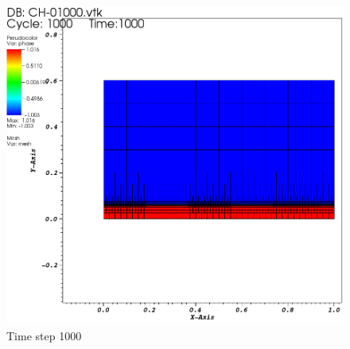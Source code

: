 \documentclass[9pt]{beamer}
\begin{document}
\begin{frame}
\begin{minipage}{.4\paperwidth}
\begin{figure}[!b]
			\includegraphics[scale=.6]{CHFlat2.png}
			\caption*{Time step 1000}
		\end{figure}
	\end{minipage}
\end{frame}
\end{document}
